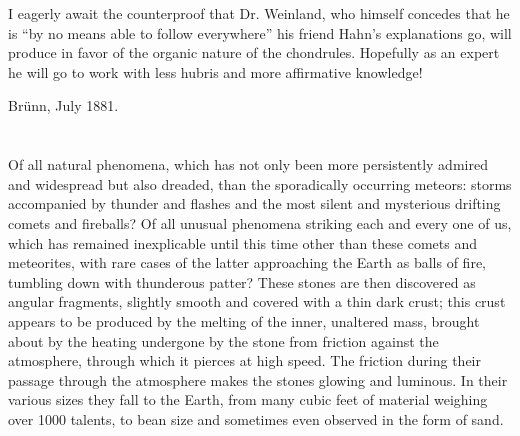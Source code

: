 \documentclass[a4paper, 12pt, oneside]{article}
\begin{document}
I eagerly await the counterproof that Dr. Weinland, who himself concedes that he is ``by no means able to follow everywhere'' his friend Hahn's explanations go, will produce in favor of the organic nature of the chondrules. Hopefully as an expert he will go to work with less hubris and more affirmative knowledge!

Brünn, July 1881.
\clearpage
\section{}
\paragraph*{}
Of all natural phenomena, which has not only been more persistently admired and widespread but also dreaded, than the sporadically occurring meteors: storms accompanied by thunder and flashes and the most silent and mysterious drifting comets and fireballs? Of all unusual phenomena striking each and every one of us, which has remained inexplicable until this time other than these comets and meteorites, with rare cases of the latter approaching the Earth as balls of fire, tumbling down with thunderous patter? These stones are then discovered as angular fragments, slightly smooth and covered with a thin dark crust; this crust appears to be produced by the melting of the inner, unaltered mass, brought about by the heating undergone by the stone from friction against the atmosphere, through which it pierces at high speed. The friction during their passage through the atmosphere makes the stones glowing and luminous. In their various sizes they fall to the Earth, from many cubic feet of material weighing over 1000 talents, to bean size and sometimes even observed in the form of sand.
\end{document}
